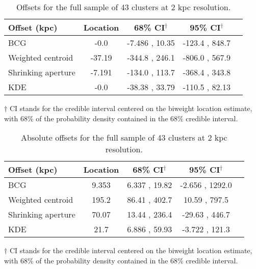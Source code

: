 \begin{table}
\caption{Offsets for the full sample of 43 clusters at 2 kpc resolution.}
\begin{center}
\begin{tabular}{@{}lcccc}

\hline \hline Offset (kpc) & Location & 68\% CI$^\dagger$ & 95\% CI$^\dagger$ \\ \hline

BCG & -0.0 & -7.486 ,  10.35 & -123.4 , 848.7 \\
Weighted centroid & -37.19 & -344.8 ,  246.1 & -806.0 , 567.9 \\
Shrinking aperture & -7.191 & -134.0 ,  113.7 & -368.4 , 343.8 \\
KDE & -0.0 & -38.38 ,  33.79 & -110.5 , 82.13 \\
\hline
\end{tabular} 
\end{center} 
\label{tab:full2kpc_offsets}
\footnotesize{$\dagger$ CI stands for the credible interval centered on the biweight location estimate, with 68\% of the probability density contained in the 68\% credible interval.}\\
\end{table}
\begin{table}
\caption{Absolute offsets for the full sample of 43 clusters at 2 kpc resolution.}
\begin{center}
\begin{tabular}{@{}lcccc}

\hline \hline Offset (kpc) & Location & 68\% CI$^\dagger$ & 95\% CI$^\dagger$ \\ \hline

BCG & 9.353 & 6.337 ,  19.82 & -2.656 , 1292.0 \\
Weighted centroid & 195.2 & 86.41 ,  402.7 & 10.59 , 797.5 \\
Shrinking aperture & 70.07 & 13.44 ,  236.4 & -29.63 , 446.7 \\
KDE & 21.7 & 6.886 ,  59.93 & -3.722 , 121.3 \\
\hline
\end{tabular} 
\end{center} 
\label{tab:full_2kpc_abs_offsets}
\footnotesize{$\dagger$ CI stands for the credible interval centered on the biweight location estimate, with 68\% of the probability density contained in the 68\% credible interval.}\\
\end{table}
